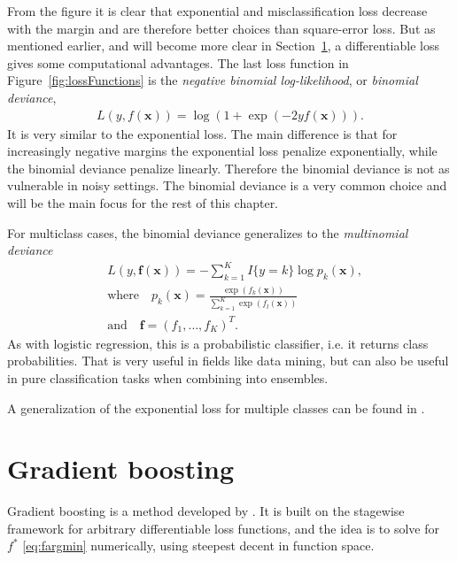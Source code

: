 From the figure it is clear that exponential and misclassification loss decrease with the margin and are therefore better choices than square-error loss. But as mentioned earlier, and will become more clear in Section~\ref{sec:Gradient boosting}, a differentiable loss gives some computational advantages. The last loss function in Figure~\ref{fig:lossFunctions} is the \textit{negative binomial log-likelihood}, or \textit{binomial deviance},
\begin{align}
  L(y, f(\mathbf{x})) = \log \left( 1 + \exp (-2 y f(\mathbf{x})) \right).
\end{align}
It is very similar to the exponential loss. The main difference is that for increasingly negative margins the exponential loss penalize exponentially, while the binomial deviance penalize linearly. Therefore the binomial deviance is not as vulnerable in noisy settings. The binomial deviance is a very common choice and will be the main focus for the rest of this chapter. 

For multiclass cases, the binomial deviance generalizes to the \textit{multinomial deviance}
\begin{align}
  \label{eq:multinomialDeviance} 
  &L(y, \mathbf{f}( \mathbf{x })) = - \sum^{K}_{k=1} I\{y = k\} \log p_k(\mathbf{x}), \\
  \label{eq:multinomialDevianceProb} 
  &\text{where} \quad p_k(\mathbf{x}) = \frac{\exp (f_k(\mathbf{x}))}{\sum^{K}_{k=1} \exp (f_l(\mathbf{x}))}\\
  &\text{and} \quad \mathbf{f} = (f_1, \ldots, f_K)^T.
\end{align}
As with logistic regression, this is a probabilistic classifier, i.e. it returns class probabilities. That is very useful in fields like data mining, but can also be useful in pure classification tasks when combining into ensembles. 

A generalization of the exponential loss for multiple classes can be found in \cite{zhu2009}.
\section{Gradient boosting}
\label{sec:Gradient boosting}
Gradient boosting is a method developed by \cite{friedman}. It is built on the stagewise framework for arbitrary differentiable loss functions, and the idea is to solve for $f^*$ \eqref{eq:fargmin} numerically, using steepest decent in function space.

